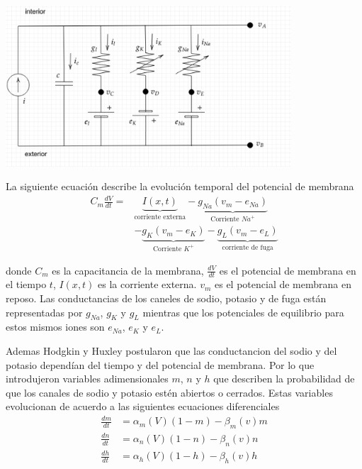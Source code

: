 \documentclass[aps,prl,reprint,groupedaddress]{revtex4-2}
\newenvironment{Figura}
  {\par\medskip\noindent\minipage{\linewidth}}
  {\endminipage\par\medskip}
\begin{document}
\begin{Figura}
    \centering
    \includegraphics[width=0.8\textwidth]{figs/circuito.png}
    \label{fig-circuito}
\end{Figura}

La siguiente ecuación describe la evolución temporal del potencial de membrana
\begin{align*}
    C_m \frac{dV}{dt} = &\underbrace{I(x,t)}_{\text{corriente externa}} - \underbrace{g_{Na}(v_{m} - e_{Na})}_{\text{Corriente $Na^{+}$}}  \\
    &- \underbrace{g_{K}(v_{m} - e_{K})}_{\text{Corriente $K^{+}$}} - \underbrace{g_{L}(v_{m} - e_{L})}_{\text{corriente de fuga}}
\end{align*}

donde $C_{m}$ es la capacitancia de la membrana, $\frac{dV}{dt}$ es el potencial 
de membrana en el tiempo $t$, $I(x,t)$ es la corriente externa. $v_{m}$ es el
potencial de membrana en reposo. Las conductancias de los caneles de sodio, 
potasio y de fuga están representadas por $g_{Na}$, $g_{K}$ y $g_{L}$ mientras 
que los potenciales de equilibrio para estos mismos iones son $e_{Na}$, $e_{K}$ 
y $e_{L}$.

Ademas Hodgkin y Huxley postularon que las conductancion del sodio y del potasio 
dependían del tiempo y del potencial de membrana. Por lo que introdujeron variables 
adimensionales $m$, $n$ y $h$ que describen la probabilidad de que los canales de
sodio y potasio estén abiertos o cerrados. Estas variables evolucionan de acuerdo a
las siguientes ecuaciones diferenciales
\begin{align*}
    \frac{dm}{dt} &= \alpha_{m}(V)(1 - m) - \beta_{m}(v)m \\
    \frac{dn}{dt} &= \alpha_{n}(V)(1 - n) - \beta_{n}(v)n \\
    \frac{dh}{dt} &= \alpha_{h}(V)(1 - h) - \beta_{h}(v)h
\end{align*}
\end{document}
